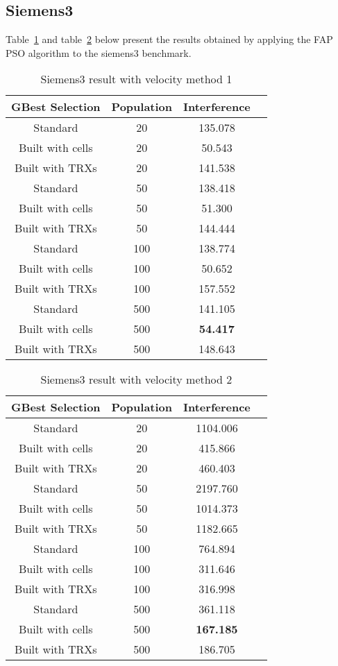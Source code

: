 \subsection{Siemens3}
Table~\ref{tab:siem3m1} and table~\ref{tab:siem3m2} below present the results obtained by applying the FAP PSO algorithm to the siemens3 benchmark.
\begin{table}[H]
\centering
	\begin{tabular}{| c | c | c | c |}
	\hline
	GBest Selection & Population & Interference\\ \hline
	Standard & 20 & 135.078\\ \hline
	Built with cells & 20 & 50.543\\ \hline
	Built with TRXs & 20 & 141.538\\ \hline
	Standard & 50 & 138.418\\ \hline
	Built with cells & 50 & 51.300\\ \hline
	Built with TRXs & 50 & 144.444\\ \hline
	Standard & 100 & 138.774\\ \hline
	Built with cells & 100 & 50.652\\ \hline
	Built with TRXs & 100 & 157.552\\ \hline
	Standard & 500 & 141.105\\ \hline
	Built with cells & 500 & \textbf{54.417}\\ \hline
	Built with TRXs & 500 & 148.643\\ \hline
	\end{tabular}
\caption{Siemens3 result with velocity method 1}
\label{tab:siem3m1}
\end{table}
\begin{table}[H]
\centering
	\begin{tabular}{| c | c | c | c |}
	\hline
	GBest Selection & Population & Interference\\ \hline
	Standard & 20 & 1104.006\\ \hline
	Built with cells & 20 & 415.866\\ \hline
	Built with TRXs & 20 & 460.403\\ \hline
	Standard & 50 & 2197.760\\ \hline
	Built with cells & 50 & 1014.373\\ \hline
	Built with TRXs & 50 & 1182.665\\ \hline
	Standard & 100 & 764.894\\ \hline
	Built with cells & 100 & 311.646\\ \hline
	Built with TRXs & 100 & 316.998\\ \hline
	Standard & 500 & 361.118\\ \hline
	Built with cells & 500 & \textbf{167.185}\\ \hline
	Built with TRXs & 500 & 186.705\\ \hline
	\end{tabular}
\caption{Siemens3 result with velocity method 2}
\label{tab:siem3m2}
\end{table}
